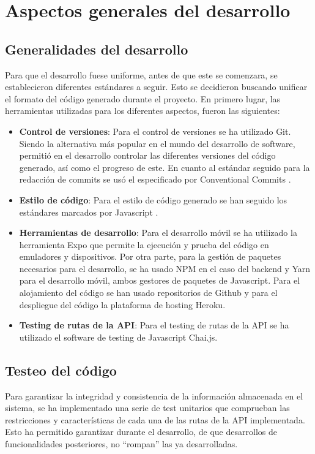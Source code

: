 \section{Aspectos generales del desarrollo}

\subsection{Generalidades del desarrollo}

Para que el desarrollo fuese uniforme, antes de que este se comenzara, se establecieron diferentes estándares a seguir. Esto se decidieron buscando unificar el formato del código generado durante el proyecto. En primero lugar, las herramientas utilizadas para los diferentes aspectos, fueron las siguientes:

\begin{itemize}
    \item \textbf{Control de versiones}: Para el control de versiones se ha utilizado Git. Siendo la alternativa más popular en el mundo del desarrollo de software, permitió en el desarrollo controlar las diferentes versiones del código generado, así como el progreso de este. En cuanto al estándar seguido para la redacción de commits se usó el especificado por Conventional Commits \cite{standardgit}.
    \item \textbf{Estilo de código}: Para el estilo de código generado se han seguido los estándares marcados por Javascript \cite{standardjs}.
    \item \textbf{Herramientas de desarrollo}: Para el desarrollo móvil se ha utilizado la herramienta Expo que permite la ejecución y prueba del código en emuladores y dispositivos. Por otra parte, para la gestión de paquetes necesarios para el desarrollo, se ha usado NPM en el caso del backend y Yarn para el desarrollo móvil, ambos gestores de paquetes de Javascript. Para el alojamiento del código se han usado repositorios de Github y para el despliegue del código la plataforma de hosting Heroku.
    \item \textbf{Testing de rutas de la API}: Para el testing de rutas de la API se ha utilizado el software de testing de Javascript Chai.js.
\end{itemize}

\subsection{Testeo del código}

Para garantizar la integridad y consistencia de la información almacenada en el sistema, se ha implementado una serie de test unitarios que comprueban las restricciones y características de cada una de las rutas de la API implementada. Esto ha permitido garantizar durante el desarrollo, de que desarrollos de funcionalidades posteriores, no ``rompan'' las ya desarrolladas.

